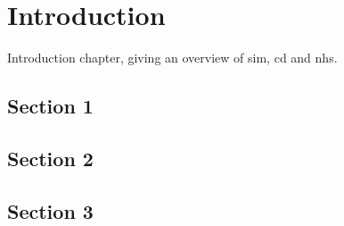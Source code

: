 \chapter{Introduction}
\label{ch:introduction}

Introduction chapter, giving an overview of \acrfull{sim}, \acrfull{cd} and \acrfull{nhs}. 

\section{Section 1}

\section{Section 2}

\section{Section 3}